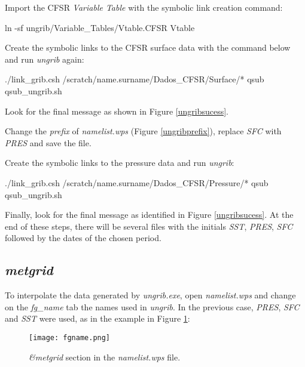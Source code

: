  Import the CFSR \textit{Variable Table} with the symbolic link creation command:
\bigskip

\begin{bashcode}
ln -sf ungrib/Variable_Tables/Vtable.CFSR Vtable
\end{bashcode}
\bigskip

 Create the symbolic links to the CFSR surface data with the command below and run \textit{ungrib} again:
\bigskip

\begin{bashcode}
./link_grib.csh /scratch/name.surname/Dados_CFSR/Surface/*
qsub qsub_ungrib.sh
\end{bashcode}
\bigskip

 Look for the final message as shown in Figure \textcolor{bleu_cite}{\ref{ungribsucess}}.
\bigskip

 Change the \textit{prefix} of \textit{namelist.wps} (Figure \textcolor{bleu_cite}{\ref{ungribprefix}}), replace \textit {SFC} with \textit{PRES} and save the file.
\bigskip

 Create the symbolic links to the pressure data and run \textit{ungrib}:
\bigskip

\begin{bashcode}
./link_grib.csh /scratch/name.surname/Dados_CFSR/Pressure/*
qsub qsub_ungrib.sh
\end{bashcode}
\bigskip

 Finally, look for the final message as identified in Figure \textcolor{bleu_cite}{\ref{ungribsucess}}. 
At the end of these steps, there will be several files with the initials \textit {SST}, \textit {PRES}, \textit {SFC} followed by the
dates of the chosen period.
\bigskip


\subsection{\textit{metgrid}}\label{metgridsecao}
\bigskip
 To interpolate the data generated by \textit{ungrib.exe}, open \textit{namelist.wps} and change on the \textit{fg\_name} tab the 
names used in \textit {ungrib}. In the previous case, \textit {PRES}, \textit{SFC} and \textit{SST} were used, as in the example in 
Figure \textcolor{bleu_cite}{\ref{fgname}}:
\bigskip

\begin{figure}[H]
    \centering
    \texttt{[image: fgname.png]}
    \caption{\textit{\&metgrid} section in the \textit{namelist.wps} file.}
    \label{fgname}
\end{figure}
\bigskip

